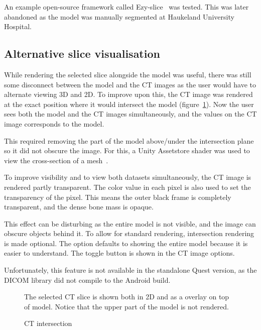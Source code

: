\documentclass[a4paper]{report}
\begin{document}
An example open-source framework called Ezy-slice~\cite{arayan_davidarayanezy-slice_2022} was tested. This was later abandoned as the model was manually segmented at Haukeland University Hospital.

\subsection{Alternative slice visualisation}
While rendering the selected slice alongside the model was useful, there was still some disconnect between the model and the CT images as the user would have to alternate viewing 3D and 2D.
To improve upon this, the CT image was rendered at the exact position where it would intersect the model (figure~\ref{intersection}). Now the user sees both the model and the CT images simultaneously, and the values on the CT image corresponds to the model.

This required removing the part of the model above/under the intersection plane so it did not obscure the image. For this, a Unity Assetstore shader was used to view the cross-section of a mesh~\cite{aldandarawy_unity_2019}.

To improve visibility and to view both datasets simultaneously, the CT image is rendered partly transparent. The color value in each pixel is also used to set the transparency of the pixel. This means the outer black frame is completely transparent, and the dense bone mass is opaque.

This effect can be disturbing as the entire model is not visible, and the image can obscure objects behind it. To allow for standard rendering, intersection rendering is made optional. The option defaults to showing the entire model because it is easier to understand.
The toggle button is shown in the CT image options.

Unfortunately, this feature is not available in the standalone Quest version, as the DICOM library did not compile to the Android build.

\begin{figure}[h!]
    \centering
	\hfill
	\caption{CT intersection}\label{intersection}
  \small
  The selected CT slice is shown both in 2D and as a overlay on top of model. Notice that the upper part of the model is not rendered.
\end{figure}
\end{document}
